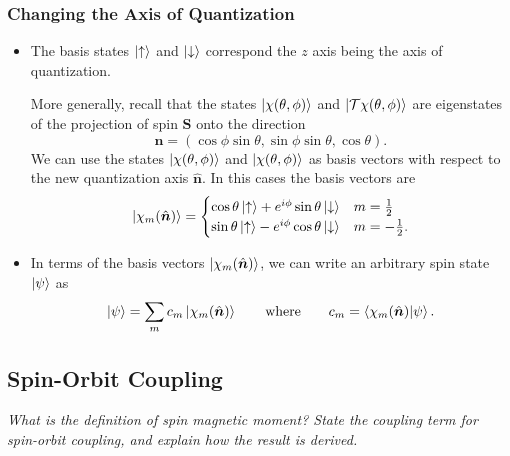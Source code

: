 \documentclass[11pt, a4paper]{article}
\renewcommand{\vec}[1]{\bm{#1}}  %
\newcommand{\uvec}[1]{\hat{\vec{#1}}}  %
\newcommand{\ua}{\uparrow}  %
\newcommand{\da}{\downarrow}  %
\newcommand{\T}{\mathcal{T}}  %
\newcommand{\p}{\psi}  %
\begin{document}
\subsubsection{Changing the Axis of Quantization}
\begin{itemize}
	\item The basis states $ \ket{\ua} $ and $ \ket{\da} $ correspond the $ z $ axis being the axis of quantization. 
	
	More generally, recall that the states $ \ket{\chi(\theta, \phi)}  $ and $ \ket{\T \chi(\theta, \phi)}  $ are eigenstates of the projection of spin $ \vec{S} $ onto the direction
	\begin{equation*}
		\uvec{n} = (\cos \phi \sin \theta, \sin \phi \sin \theta, \cos \theta).
	\end{equation*}
    We can use the states $ \ket{\chi(\theta, \phi)} $ and $ \ket{\chi(\theta, \phi)} $ as basis vectors with respect to the new quantization axis $ \uvec{n} $. In this cases the basis vectors are
	\begin{equation*}
		\ket{\chi_{m}(\uvec{n})} = 
		\begin{cases}
			\cos \theta \ket{\ua} + e^{i\phi} \sin \theta \ket{\da} & m = \frac{1}{2}\\
			\sin \theta \ket{\ua} - e^{i\phi} \cos \theta \ket{\da} & m = -\frac{1}{2}.
		\end{cases}
	\end{equation*}
	
	\item In terms of the basis vectors $ \ket{\chi_{m}(\uvec{n})} $, we can write an arbitrary spin state $ \ket{\p} $ as
	\begin{equation*}
		\ket{\p} = \sum_{m} c_{m}\ket{\chi_{m}(\uvec{n})} \qquad \text{where} \qquad c_{m} =  \braket{\chi_{m}(\uvec{n})}{\p}.
	\end{equation*}
	
\end{itemize}


\subsection{Spin-Orbit Coupling}
\textit{What is the definition of spin magnetic moment? State the coupling term for spin-orbit coupling, and explain how the result is derived.}
\end{document}
